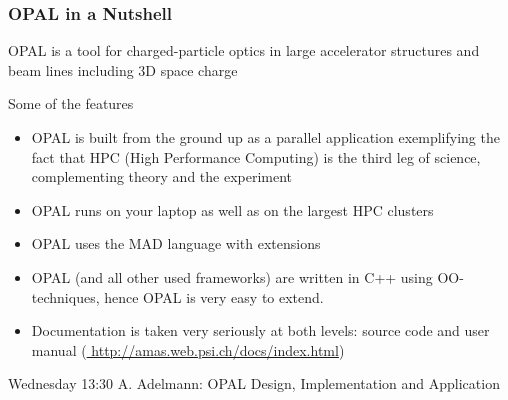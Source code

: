 \documentclass[xcolor=pdftex,table,10pt]{beamer}
\newcommand{\opal}{\textsc{OPAL }}
\begin{document}
    \begin{frame}
        \frametitle{\opal in a Nutshell}

        \begin{alertblock}{}  
         \opal is a tool for charged-particle optics in large
         accelerator structures and beam lines including 3D space charge
        \end{alertblock}

        \vspace{0.2cm}

        \begin{block}{Some of the features}  
         \begin{itemize}
         \item \opal is built from the ground up as a parallel application exemplifying the fact that HPC (High Performance Computing) 
         is the third leg of science, complementing theory and the experiment
         \item  \opal runs on your laptop as well as on the largest HPC clusters
         \item \opal uses the \textsc{MAD} language with extensions
         \item \opal (and all other used frameworks) are written in C++ using OO-techniques, hence \opal is very easy to extend.
         \item Documentation is taken very seriously at both levels: source code and user manual (\url{ http://amas.web.psi.ch/docs/index.html})
         \end{itemize}
        \end{block}

        \alert{Wednesday 13:30 A. Adelmann: OPAL Design, Implementation and Application}

    \end{frame}
\end{document}

